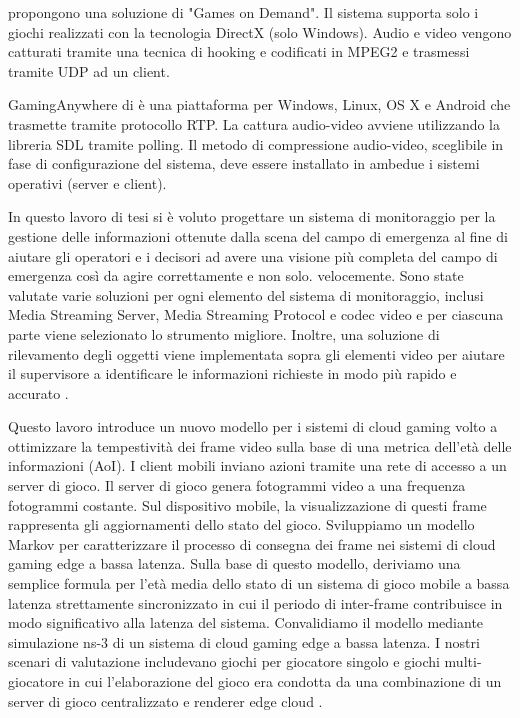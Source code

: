 \parencite{ARealTimeStreamingGamesonDemandSystem} propongono una soluzione di "Games on Demand". Il sistema supporta solo i giochi realizzati con la tecnologia DirectX (solo Windows). Audio e video vengono catturati tramite una tecnica di hooking e codificati in MPEG2 e trasmessi tramite UDP ad un client.

GamingAnywhere di \parencite{GamingAnywhere} è una piattaforma per Windows, Linux, OS X e Android che trasmette tramite protocollo RTP. La cattura audio-video avviene utilizzando la libreria SDL tramite polling. Il metodo di compressione audio-video, sceglibile in fase di configurazione del sistema, deve essere installato in ambedue i sistemi operativi (server e client).


In questo lavoro di tesi si è voluto progettare un sistema di monitoraggio per la gestione delle informazioni ottenute dalla scena del campo di emergenza al fine di aiutare gli operatori e i decisori ad avere una visione più completa del campo di emergenza così da agire correttamente e non solo. velocemente.
Sono state valutate varie soluzioni per ogni elemento del sistema di monitoraggio, inclusi Media Streaming Server, Media Streaming Protocol e codec video e per ciascuna parte viene selezionato lo strumento migliore. Inoltre, una soluzione di rilevamento degli oggetti viene implementata sopra gli elementi video per aiutare il supervisore a identificare le informazioni richieste in modo più rapido e accurato \parencite{CombinedICTTechnologiesforSupervisionofComplexOperationsinResilientCommunities}.

Questo lavoro introduce un nuovo modello per i sistemi di cloud gaming volto a ottimizzare la tempestività dei frame video sulla base di una metrica dell'età delle informazioni (AoI). I client mobili inviano azioni tramite una rete di accesso a un server di gioco. Il server di gioco genera fotogrammi video a una frequenza fotogrammi costante. Sul dispositivo mobile, la visualizzazione di questi frame rappresenta gli aggiornamenti dello stato del gioco. Sviluppiamo un modello Markov per caratterizzare il processo di consegna dei frame nei sistemi di cloud gaming edge a bassa latenza. Sulla base di questo modello, deriviamo una semplice formula per l'età media dello stato di un sistema di gioco mobile a bassa latenza strettamente sincronizzato in cui il periodo di inter-frame contribuisce in modo significativo alla latenza del sistema. Convalidiamo il modello mediante simulazione ns-3 di un sistema di cloud gaming edge a bassa latenza. I nostri scenari di valutazione includevano giochi per giocatore singolo e giochi multi-giocatore in cui l'elaborazione del gioco era condotta da una combinazione di un server di gioco centralizzato e renderer edge cloud \parencite{Timely_cloud_gaming}.


